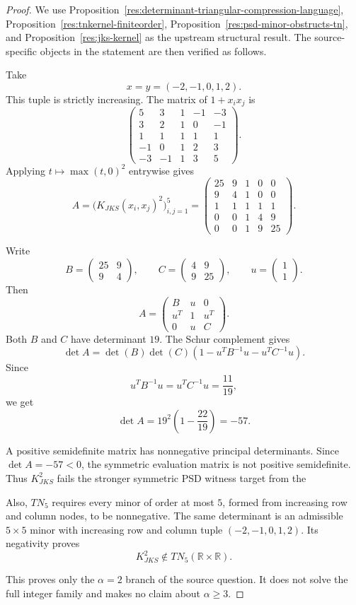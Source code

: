 \documentclass[11pt]{article}
\numberwithin{equation}{section}
\theoremstyle{definition}
\theoremstyle{remark}
\newcommand{\1}{\mathbf 1}
\begin{document}
\begin{proof}
We use Proposition~\ref{res:determinant-triangular-compression-language}, Proposition~\ref{res:tnkernel-finiteorder}, Proposition~\ref{res:psd-minor-obstructs-tn}, and Proposition~\ref{res:jks-kernel} as the upstream structural result. The source-specific objects in the statement are then verified as follows.

Take
\[
x=y=(-2,-1,0,1,2).
\]
This tuple is strictly increasing. The matrix of \(1+x_i x_j\) is
\[
\begin{pmatrix}
5&3&1&-1&-3\\
3&2&1&0&-1\\
1&1&1&1&1\\
-1&0&1&2&3\\
-3&-1&1&3&5
\end{pmatrix}.
\]
Applying \(t\mapsto \max(t,0)^2\) entrywise gives
\[
A=\bigl(K_{JKS}(x_i,x_j)^2\bigr)_{i,j=1}^5
=
\begin{pmatrix}
25&9&1&0&0\\
9&4&1&0&0\\
1&1&1&1&1\\
0&0&1&4&9\\
0&0&1&9&25
\end{pmatrix}.
\]

Write
\[
B=\begin{pmatrix}25&9\\9&4\end{pmatrix},\qquad
C=\begin{pmatrix}4&9\\9&25\end{pmatrix},\qquad
u=\begin{pmatrix}1\\1\end{pmatrix}.
\]
Then
\[
A=
\begin{pmatrix}
B&u&0\\
u^T&1&u^T\\
0&u&C
\end{pmatrix}.
\]
Both \(B\) and \(C\) have determinant \(19\). The Schur complement gives
\[
\det A=\det(B)\det(C)\left(1-u^T B^{-1}u-u^T C^{-1}u\right).
\]
Since
\[
u^T B^{-1}u=u^T C^{-1}u=\frac{11}{19},
\]
we get
\[
\det A=19^2\left(1-\frac{22}{19}\right)=-57.
\]

A positive semidefinite matrix has nonnegative principal determinants. Since
\(\det A=-57<0\), the symmetric evaluation matrix is not positive semidefinite.
Thus \(K_{JKS}^2\) fails the stronger symmetric PSD witness target from the

Also, \(TN_5\) requires every minor of order at most \(5\), formed from
increasing row and column nodes, to be nonnegative. The same determinant is an
admissible \(5\times5\) minor with increasing row and column tuple
\((-2,-1,0,1,2)\). Its negativity proves
\[
K_{JKS}^2\notin TN_5(\mathbb R\times\mathbb R).
\]

This proves only the \(\alpha=2\) branch of the source question. It does not
solve the full integer family and makes no claim about \(\alpha\ge3\).
\end{proof}
\end{document}
